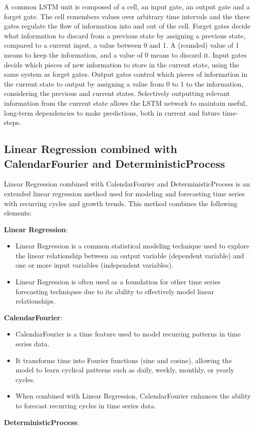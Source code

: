 \documentclass{ieeeojies}
\begin{document}
A common LSTM unit is composed of a cell, an input gate, an output gate and a forget gate. The cell remembers values over arbitrary time intervals and the three gates regulate the flow of information into and out of the cell. Forget gates decide what information to discard from a previous state by assigning a previous state, compared to a current input, a value between 0 and 1. A (rounded) value of 1 means to keep the information, and a value of 0 means to discard it. Input gates decide which pieces of new information to store in the current state, using the same system as forget gates. Output gates control which pieces of information in the current state to output by assigning a value from 0 to 1 to the information, considering the previous and current states. Selectively outputting relevant information from the current state allows the LSTM network to maintain useful, long-term dependencies to make predictions, both in current and future time-steps.

\subsection{Linear Regression combined with CalendarFourier and DeterministicProcess }

Linear Regression combined with CalendarFourier and DeterministicProcess is an extended linear regression method used for modeling and forecasting time series with recurring cycles and growth trends. This method combines the following elements: 

\textbf{Linear Regression}:

\begin{itemize}
    \item Linear Regression is a common statistical modeling technique used to explore the linear relationship between an output variable (dependent variable) and one or more input variables (independent variables).
    \item Linear Regression is often used as a foundation for other time series forecasting techniques due to its ability to effectively model linear relationships.
\end{itemize}
\textbf{CalendarFourier}:

\begin{itemize}
    \item CalendarFourier is a time feature used to model recurring patterns in time series data.
    \item It transforms time into Fourier functions (sine and cosine), allowing the model to learn cyclical patterns such as daily, weekly, monthly, or yearly cycles.
    \item When combined with Linear Regression, CalendarFourier enhances the ability to forecast recurring cycles in time series data.
\end{itemize}
\textbf{DeterministicProcess}:
\end{document}
